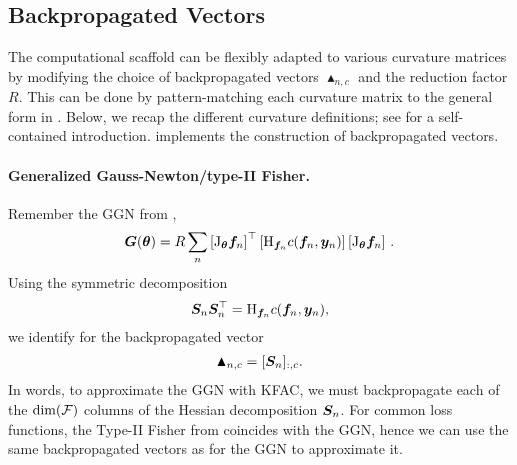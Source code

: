 \subsection{Backpropagated Vectors}\label{subsec:backpropagated-vectors}
The computational scaffold can be flexibly adapted to various curvature matrices by modifying the choice of backpropagated vectors $\blacktriangle_{n,c}$ and the reduction factor $R$.
This can be done by pattern-matching each curvature matrix to the general form in .
Below, we recap the different curvature definitions; see  for a self-contained introduction.
 implements the construction of backpropagated vectors.

\paragraph{Generalized Gauss-Newton/type-II Fisher.} Remember the GGN from ,
\begin{align*}
  {\bm{G}}({\bm{\theta}})= R \sum_n
  \left[\mathrm{J}_{{\bm{\theta}}} {\bm{f}}_n\right]^{\top}
  \left[\mathrm{H}_{{\bm{f}}_n} c({\bm{f}}_n, {\bm{y}}_n)
  \right]
  \left[\mathrm{J}_{{\bm{\theta}}} {\bm{f}}_n\right]\,.
\end{align*}
Using the symmetric decomposition
$${\bm{S}}_n {\bm{S}}_n^{\top} = \mathrm{H}_{{\bm{f}}_n} c({\bm{f}}_n, {\bm{y}}_n),$$ we identify for the backpropagated vector
\begin{align*}
  \blacktriangle_{n,c} = [{\bm{S}}_n]_{:,c}.
\end{align*}
In words, to approximate the GGN with KFAC, we must backpropagate each of the $\dim({\mathcal{F}})$ columns of the Hessian decomposition ${\bm{S}}_n$.
For common loss functions, the Type-II Fisher from  coincides with the GGN, hence we can use the same backpropagated vectors as for the GGN to approximate it.

